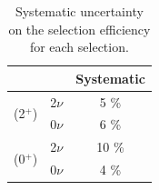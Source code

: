 \documentclass[main.tex]{subfiles}
\begin{document}
\begin{table}[h!]
\centering
\begin{tabular}{cc|c}
& & Systematic \\
\toprule
\multirow{2}{*}{(2$^+$)} & 2$\nu$ & 5 \% \\
                         & 0$\nu$ & 6 \% \\ 
\hline
\multirow{2}{*}{(0$^+$)} & 2$\nu$ & 10 \% \\
                         & 0$\nu$ & 4 \% \\ 
\bottomrule
\end{tabular}
\caption{Systematic uncertainty on the selection efficiency for each selection.}
\label{Tab:summaryEffSyst}
\end{table}









\end{document}
